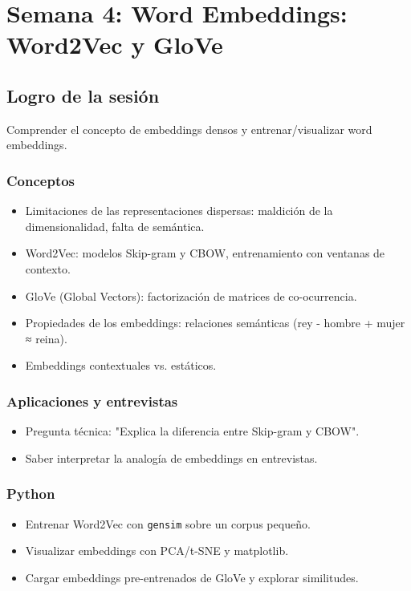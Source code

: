 \documentclass[12pt,a4paper,openany,oneside]{book}
\begin{document}
\chapter{Semana 4: Word Embeddings: Word2Vec y GloVe}

\section{Logro de la sesión}
Comprender el concepto de embeddings densos y entrenar/visualizar word embeddings.

\subsection{Conceptos}
\begin{itemize}
    \item Limitaciones de las representaciones dispersas: maldición de la dimensionalidad, falta de semántica.
    \item Word2Vec: modelos Skip-gram y CBOW, entrenamiento con ventanas de contexto.
    \item GloVe (Global Vectors): factorización de matrices de co-ocurrencia.
    \item Propiedades de los embeddings: relaciones semánticas (rey - hombre + mujer ≈ reina).
    \item Embeddings contextuales vs. estáticos.
\end{itemize}

\subsection{Aplicaciones y entrevistas}
\begin{itemize}
    \item Pregunta técnica: "Explica la diferencia entre Skip-gram y CBOW".
    \item Saber interpretar la analogía de embeddings en entrevistas.
\end{itemize}

\subsection{Python}
\begin{itemize}
    \item Entrenar Word2Vec con \texttt{gensim} sobre un corpus pequeño.
    \item Visualizar embeddings con PCA/t-SNE y matplotlib.
    \item Cargar embeddings pre-entrenados de GloVe y explorar similitudes.
\end{itemize}
\end{document}
